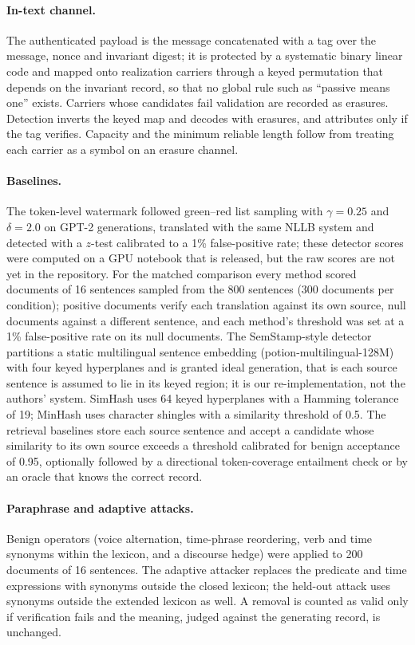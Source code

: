 \documentclass[12pt]{article}
\begin{document}
\paragraph{In-text channel.} The authenticated payload is the message concatenated with a tag over the message, nonce and invariant digest; it is protected by a systematic binary linear code and mapped onto realization carriers through a keyed permutation that depends on the invariant record, so that no global rule such as ``passive means one'' exists. Carriers whose candidates fail validation are recorded as erasures. Detection inverts the keyed map and decodes with erasures, and attributes only if the tag verifies. Capacity and the minimum reliable length follow from treating each carrier as a symbol on an erasure channel.

\paragraph{Baselines.} The token-level watermark followed green--red list sampling\cite{kirchenbauer2023kgw} with $\gamma=0.25$ and $\delta=2.0$ on GPT-2 generations, translated with the same NLLB system and detected with a $z$-test calibrated to a 1\% false-positive rate; these detector scores were computed on a GPU notebook that is released, but the raw scores are not yet in the repository. For the matched comparison every method scored documents of 16 sentences sampled from the 800 sentences (300 documents per condition); positive documents verify each translation against its own source, null documents against a different sentence, and each method's threshold was set at a 1\% false-positive rate on its null documents. The SemStamp-style detector\cite{hou2024semstamp} partitions a static multilingual sentence embedding (potion-multilingual-128M) with four keyed hyperplanes and is granted ideal generation, that is each source sentence is assumed to lie in its keyed region; it is our re-implementation, not the authors' system. SimHash\cite{charikar2002simhash} uses 64 keyed hyperplanes with a Hamming tolerance of 19; MinHash\cite{broder1997minhash} uses character shingles with a similarity threshold of 0.5. The retrieval baselines store each source sentence and accept a candidate whose similarity to its own source exceeds a threshold calibrated for benign acceptance of 0.95, optionally followed by a directional token-coverage entailment check or by an oracle that knows the correct record.

\paragraph{Paraphrase and adaptive attacks.} Benign operators (voice alternation, time-phrase reordering, verb and time synonyms within the lexicon, and a discourse hedge) were applied to 200 documents of 16 sentences. The adaptive attacker replaces the predicate and time expressions with synonyms outside the closed lexicon; the held-out attack uses synonyms outside the extended lexicon as well. A removal is counted as valid only if verification fails and the meaning, judged against the generating record, is unchanged.
\end{document}
